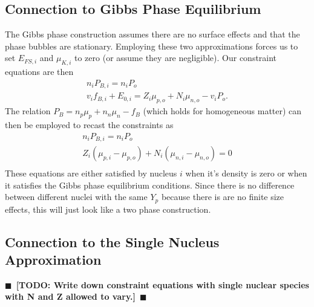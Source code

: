 \documentclass[11pt,letter]{article}
\newcommand{\todo}[1]{{$\blacksquare$~\textbf{\color{blue}[TODO: #1]}}~$\blacksquare$}
\begin{document}
\subsection{Connection to Gibbs Phase Equilibrium}
The Gibbs phase construction assumes there are no surface effects and that the
phase bubbles are stationary.  Employing these two approximations forces us to
set $E_{FS,i}$ and $\mu_{K,i}$ to zero (or assume they are negligible).  Our
constraint equations are then \begin{eqnarray*}
n_i P_{B,i} = n_i P_o \\ 
v_i f_{B,i} + E_{0,i} =  Z_i \mu_{p,o} + N_i \mu_{n,o} - v_i P_o.
\end{eqnarray*}
The relation $P_B = n_p \mu_p + n_n \mu_n - f_B$ (which holds for 
homogeneous matter) can then be employed to recast
the constraints as \begin{eqnarray*}
n_i P_{B,i} = n_i P_o \\ 
Z_i \left(\mu_{p,i} - \mu_{p,o}\right) + N_i \left(\mu_{n,i} - \mu_{n,o}\right) = 0\\
\end{eqnarray*}
These equations are either satisfied by nucleus $i$ when it's density is zero or
when it satisfies the Gibbs phase equilibrium conditions.  Since there is no
difference between different nuclei with the same $Y_p$ because there is are no
finite size effects, this will just look like a two phase construction.    

\subsection{Connection to the Single Nucleus Approximation} 
\todo{Write down constraint equations with single nuclear species with N and Z 
allowed to vary.}
\end{document}
